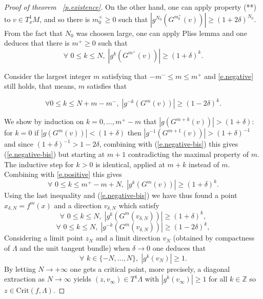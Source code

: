 \documentclass[a4paper,11pt]{article}
\theoremstyle{definition}
\def\La{\Lambda}
\def\de{\delta}
\def\La{\Lambda}
\begin{document}
\begin{proof}[Proof of theorem ~\ref{p.existence}]
On the other hand, one can  apply property (**) to $v\in T^1_xM$, and so there is $m^+_0\geq 0$ such that $|g^{N_0}(G^{m^+_0}(v))|\geq (1+2\delta)^{N_0}$. From the fact that $N_0$ was choosen large, one can apply  Pliss lemma and  one deduces that there is $m^+\geq 0$ such that
\begin{equation}\label{e.positive}
\forall\,\, 0\leq k\leq N,\;|g^k(G^{m^+}(v))|\geq (1+\delta)^k.
\end{equation}


Consider the largest integer $m$ satisfying that  $-m^-\leq m\leq m^+$ and \eqref{e.negative} still holds, that means, $m$ satisfies
that 

\begin{equation}\label{e.negative-bis}
 \forall  0\leq k\leq N+ m-m^- , \; |g^{-k}(G^{m}(v))|\geq (1-2\delta)^k. 
\end{equation}



We show by induction on $k=0,\dots, m^+-m$ that $|g(G^{m+k}(v))|> (1+\delta):$ for $k=0$  if $|g(G^{m}(v))|<(1+\delta)$  then $|g^{-1}(G^{m+1}(v))|>(1+\delta)^{-1}$  and since $(1+\de)^{-1}> 1-2\de$, combining with  (\ref{e.negative-bis}) this gives (\ref{e.negative-bis}) but starting at  $m+1$ contradicting the maximal property of $m.$ The inductive step for $k > 0$ is identical, applied at  $m+k$ instead of $m$. Combining with   \eqref{e.positive} this gives
$$\forall \,\, 0\leq k\leq m^+-m+N,\; |g^{k}(G^{m}(v))|\geq (1+\delta)^k.$$
Using the last inequality and (\ref{e.negative-bis}) we have thus found a point $x_{\delta,N}=f^m(x)$ and a direction $v_{\delta,N}$ which satisfy
$$\forall \,\, 0\leq k\leq N,\; |g^{k}(G^{m}(v_{\delta,N}))|\geq (1+\delta)^k,$$
$$\forall\,\, 0\leq k\leq N,\; |g^{-k}(G^{m}(v_{\delta,N}))|\geq (1-2\delta)^k,$$
Considering a limit point $z_N$ and a limit direction $v_N$ (obtained by compactness of $\La$ and the unit tangent bundle) when $\delta\to 0$ one deduces that 
$$\forall \,\, k\in \{-N,\dots, N\},\; |g^{k}(v_N)|\geq 1.$$
By letting $N\to +\infty$ one gets a critical point, more precisely, a diagonal extraction as $N \to \infty$ yields $(z, v_\infty) \in T^1 \Lambda$ with $|g^k(v_\infty)| \geq 1$  for all $k \in \mathbb{Z}$ so $z\in \mathrm{Crit}(f, \Lambda)$.
\end{proof}
\end{document}
